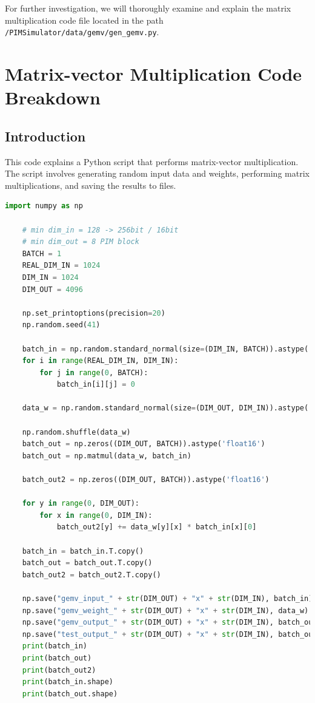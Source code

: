 \documentclass[12pt]{article}
\begin{document}
For further investigation, we will thoroughly examine and explain the matrix multiplication code file located in the path \texttt{/PIMSimulator/data/gemv/gen\_gemv.py}.




\section{Matrix-vector Multiplication Code Breakdown}

\subsection{Introduction}
This code explains a Python script that performs matrix-vector multiplication. The script involves generating random input data and weights, performing matrix multiplications, and saving the results to files.
\begin{lstlisting}[language=Python, caption=Python Code]
	import numpy as np
	
	# min dim_in = 128 -> 256bit / 16bit
	# min dim_out = 8 PIM block
	BATCH = 1
	REAL_DIM_IN = 1024
	DIM_IN = 1024
	DIM_OUT = 4096
	
	np.set_printoptions(precision=20)
	np.random.seed(41)
	
	batch_in = np.random.standard_normal(size=(DIM_IN, BATCH)).astype('float16')
	for i in range(REAL_DIM_IN, DIM_IN):
		for j in range(0, BATCH):
			batch_in[i][j] = 0
	
	data_w = np.random.standard_normal(size=(DIM_OUT, DIM_IN)).astype('float16')
	
	np.random.shuffle(data_w)
	batch_out = np.zeros((DIM_OUT, BATCH)).astype('float16')
	batch_out = np.matmul(data_w, batch_in)
	
	batch_out2 = np.zeros((DIM_OUT, BATCH)).astype('float16')
	
	for y in range(0, DIM_OUT):
		for x in range(0, DIM_IN):
			batch_out2[y] += data_w[y][x] * batch_in[x][0]
	
	batch_in = batch_in.T.copy()
	batch_out = batch_out.T.copy()
	batch_out2 = batch_out2.T.copy()
	
	np.save("gemv_input_" + str(DIM_OUT) + "x" + str(DIM_IN), batch_in)
	np.save("gemv_weight_" + str(DIM_OUT) + "x" + str(DIM_IN), data_w)
	np.save("gemv_output_" + str(DIM_OUT) + "x" + str(DIM_IN), batch_out)
	np.save("test_output_" + str(DIM_OUT) + "x" + str(DIM_IN), batch_out2)
	print(batch_in)
	print(batch_out)
	print(batch_out2)
	print(batch_in.shape)
	print(batch_out.shape)
\end{lstlisting}
\end{document}
